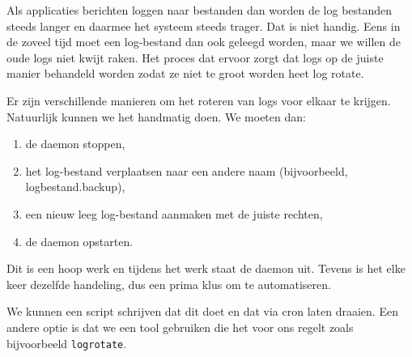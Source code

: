 Als applicaties berichten loggen naar bestanden dan worden de log bestanden steeds langer en daarmee het systeem steeds trager. Dat is niet handig. Eens in de zoveel tijd moet een log-bestand dan ook geleegd worden, maar we willen de oude logs niet kwijt raken. Het proces dat ervoor zorgt dat logs op de juiste manier behandeld worden zodat ze niet te groot worden heet log rotate.

Er zijn verschillende manieren om het roteren van logs voor elkaar te krijgen. Natuurlijk kunnen we het handmatig doen. We moeten dan:
\begin{enumerate}
\item de daemon stoppen,
\item het log-bestand verplaatsen naar een andere naam (bijvoorbeeld, logbestand.backup),
\item een nieuw leeg log-bestand aanmaken met de juiste rechten,
\item de daemon opstarten.
\end{enumerate}
Dit is een hoop werk en tijdens het werk staat de daemon uit. Tevens is het elke keer dezelfde handeling, dus een prima klus om te automatiseren.

We kunnen een script schrijven dat dit doet en dat via cron laten draaien. Een andere optie is dat we een tool gebruiken die het voor ons regelt zoals bijvoorbeeld \texttt{logrotate}.

